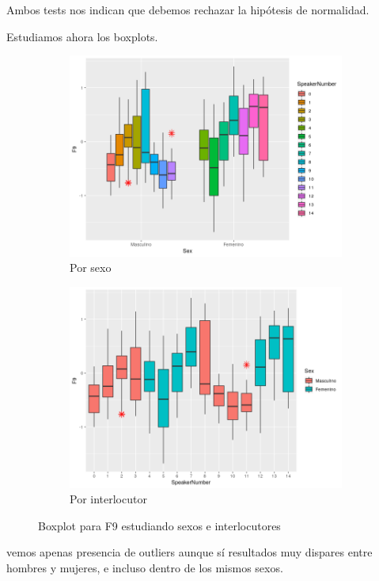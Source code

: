 Ambos tests nos indican que debemos rechazar la hipótesis de normalidad.

Estudiamos ahora los boxplots.

\begin{figure}[H]
	\centering
	\begin{subfigure}{.5\textwidth}
		\centering
		\includegraphics[width=.9\linewidth]{bps9.png}
		\caption{Por sexo}
		\label{fig:bps9}
	\end{subfigure}%
	\begin{subfigure}{.5\textwidth}
		\centering
		\includegraphics[width=.9\linewidth]{bpsn9.png}
		\caption{Por interlocutor}
		\label{fig:bpsn9}
	\end{subfigure}
	\caption{Boxplot para F9 estudiando sexos e interlocutores}
	\label{fig:bf9}
\end{figure}

vemos apenas presencia de outliers aunque sí resultados muy dispares entre hombres y mujeres, e incluso dentro de los mismos sexos. \\


